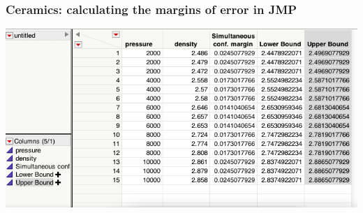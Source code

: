 \documentclass[handout]{beamer}\usepackage{graphicx, color}
\numberwithin{equation}{section}
\begin{document}
\begin{frame}
\frametitle{Ceramics: calculating the margins of error in JMP}
 \includegraphics{../../fig/simuljmp22.png}
\end{frame}
\end{document}
